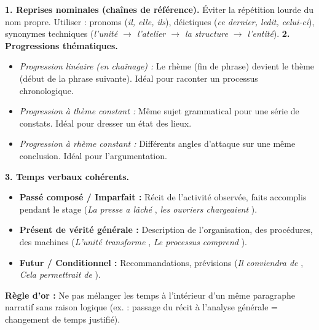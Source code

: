 \documentclass[11pt]{article}
\begin{document}
\begin{propriete}
\textbf{1. Reprises nominales (chaînes de référence).} Éviter la répétition lourde du nom propre. Utiliser : pronoms (\emph{il, elle, ils}), déictiques (\emph{ce dernier, ledit, celui-ci}), synonymes techniques (\emph{l'unité $\rightarrow$ l'atelier $\rightarrow$ la structure $\rightarrow$ l'entité}).
\textbf{2. Progressions thématiques.}
\begin{itemize}
    \item \emph{Progression linéaire (en chaînage) :} Le rhème (fin de phrase) devient le thème (début de la phrase suivante). Idéal pour raconter un processus chronologique.
    \item \emph{Progression à thème constant :} Même sujet grammatical pour une série de constats. Idéal pour dresser un état des lieux.
    \item \emph{Progression à rhème constant :} Différents angles d'attaque sur une même conclusion. Idéal pour l'argumentation.
\end{itemize}
\textbf{3. Temps verbaux cohérents.}
\begin{itemize}
    \item \textbf{Passé composé / Imparfait :} Récit de l'activité observée, faits accomplis pendant le stage (\og \emph{La presse a lâché} \fg{}, \og \emph{les ouvriers chargeaient} \fg{}).
    \item \textbf{Présent de vérité générale :} Description de l'organisation, des procédures, des machines (\og \emph{L'unité transforme} \fg{}, \og \emph{Le processus comprend} \fg{}).
    \item \textbf{Futur / Conditionnel :} Recommandations, prévisions (\og \emph{Il conviendra de} \fg{}, \og \emph{Cela permettrait de} \fg{}).
\end{itemize}
\textbf{Règle d'or :} Ne pas mélanger les temps à l'intérieur d'un même paragraphe narratif sans raison logique (ex. : passage du récit à l'analyse générale = changement de temps justifié).
\end{propriete}
\end{document}
